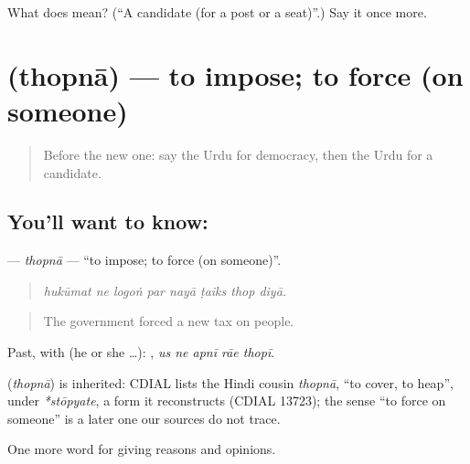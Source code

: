 \begin{tcolorbox}[breakable,colback=teal!4,colframe=teal!35!black,title={Before you move on}]
What does  mean? (\textquotedblleft{}A candidate (for a post or a seat)\textquotedblright{}.) Say it once more.
\end{tcolorbox}
\section[\texorpdfstring{\ur{تھوپنا} (thopnā)}{تھوپنا (thopnā)}]{ (thopnā) — to impose; to force (on someone)}

\label{lesson:UR-C342-thopna}



\begin{quote}
Before the new one: say the Urdu for democracy, then the Urdu for a candidate.
\end{quote}

\subsection*{You'll want to know: }
\textbf{} — \emph{thopnā} — \textquotedblleft{}to impose; to force (on someone)\textquotedblright{}.

\begin{quote}
       
\end{quote}

\begin{quote}
\emph{hukūmat ne logoṅ par nayā ṭaiks thop diyā.}
\end{quote}

\begin{quote}
The government forced a new tax on people.
\end{quote}

Past, with  (he or she …):     , \emph{us ne apnī rāe thopī}.

\begin{cousinweb}
\textbf{} (\emph{thopnā}) is inherited: CDIAL lists the Hindi cousin \emph{thopnā}, \textquotedblleft{}to cover, to heap\textquotedblright{}, under \emph{*stōpyate}, a form it reconstructs (CDIAL 13723); the sense \textquotedblleft{}to force on someone\textquotedblright{} is a later one our sources do not trace.
\end{cousinweb}

\begin{grammarlens}[title={What you've built}]
One more word for giving reasons and opinions.
\end{grammarlens}

